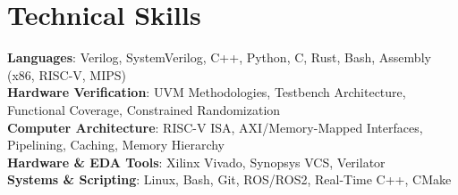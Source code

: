 \section{Technical Skills}
 \begin{itemize}[leftmargin=0.15in, label={}]
    \small{\item{
     \textbf{Languages}{: Verilog, SystemVerilog, C++, Python, C, Rust, Bash, Assembly (x86, RISC-V, MIPS)} \\
		 \textbf{Hardware Verification}{: UVM Methodologies, Testbench Architecture, Functional Coverage, Constrained Randomization} \\
     \textbf{Computer Architecture}{: RISC-V ISA, AXI/Memory-Mapped Interfaces, Pipelining, Caching, Memory Hierarchy} \\
		 \textbf{Hardware \& EDA Tools}{: Xilinx Vivado, Synopsys VCS, Verilator} \\
		 \textbf{Systems \& Scripting}{: Linux, Bash, Git, ROS/ROS2, Real-Time C++, CMake} \\
    }}
 \end{itemize}
